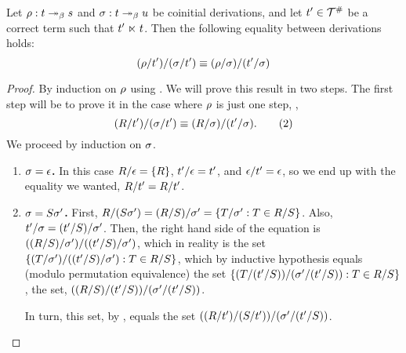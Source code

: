 \begin{lemma}
Let $\rho : t \mathrel{\twoheadrightarrow_\beta} s$ and $\sigma : t \mathrel{\twoheadrightarrow_\beta} u$ be coinitial derivations,
and let $t' \in \mathcal{T}^{\mathtt{\#}}$ be a correct term such that $t' \mathrel{\ltimes} t$.
Then the following equality between derivations holds:
\[
  (\rho/t')/(\sigma/t') \equiv (\rho/\sigma)/(t'/\sigma)
\]
\end{lemma}
\begin{proof}
By induction on $\rho$ using .
We will prove this result in two steps. The first step will be to prove it in the case where $\rho$ is just one step, \ie, \[(R / t') / (\sigma / t') \equiv (R / \sigma) / (t' / \sigma). \tag{2} \label{eq:cubelemma_partial_result}\]
We proceed by induction on $\sigma$.
\begin{enumerate}
  \item {\bf $\sigma = \epsilon$.}
    In this case $R / \epsilon = \{R\}$, $t' / \epsilon = t'$, and $\epsilon / t' = \epsilon$,
    so we end up with the equality we wanted, $R / t' = R / t'$.
  \item {\bf $\sigma = S \sigma'$.}
    First, $R / (S \sigma') = (R / S) / \sigma'
            = \{T / \sigma' : T \in R / S\}$.
    Also, $t' / \sigma = (t' / S) / \sigma'$.
    Then, the right hand side of the equation is
    $((R / S) / \sigma') / ((t' / S) / \sigma')$,
    which in reality is the set
    $\{(T / \sigma') / ((t' / S) / \sigma') : T \in R / S\}$,
    which by inductive hypothesis equals (modulo permutation equivalence) the set
    $\{(T / (t' / S)) / (\sigma' / (t' / S)) : T \in R / S\}$,
    \ie the set, $((R / S) / (t' / S)) / (\sigma' / (t' / S))$.

    In turn, this set, by , equals the set
    $((R / t') / (S / t')) / (\sigma' / (t' / S))$.


\end{enumerate}
\end{proof}
